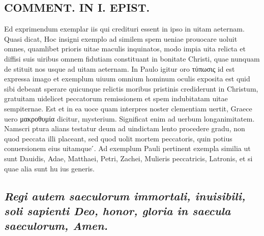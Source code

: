 \documentclass{article}
\begin{document}
\begin{pages}
\section*{COMMENT. IN I. EPIST. }\pstart Ed exprimendum exemplar iis qui credituri essent in ipso in uitam aeternam. Quasi dicat, Hoc insigni exemplo ad similem spem ueniae prouocare uoluit omnes, quamlibet prioris uitae maculis inquinatos, modo impia uita relicta et diffisi suis uiribus omnem fidutiam constituant in bonitate Christi, quae nunquam de stituit nos usque ad uitam aeternam. In Paulo igitur oro τύπωσις id est expressa imago et exemplum uiuum omnium hominum oculis exposita est quid sibi debeant sperare quicunque relictis moribus pristinis crediderunt in Christum, gratuitam uidelicet peccatorum remissionem et spem indubitatam uitae sempiternae. Est et in ea uoce quam interpres noster clementiam uertit, Graece uero μακροθυμία dicitur, mysterium. Significat enim ad uerbum longanimitatem. Namscri ptura alians testatur deum ad uindictam lento procedere gradu, non quod peccata illi placeant, sed quod uolit mortem peccatoris, quin potius conuersionem eius uitamque ́. Ad exemplum Pauli pertinent exempla similia ut sunt Dauidis, Adae, Matthaei, Petri, Zachei, Mulieris peccatricis, Latronis, et si quae alia sunt hu ius generis.  \pend
{}
{}
\subsection*{\textit{Regi autem saeculorum immortali, inuisibili, soli sapienti Deo, honor, gloria in saecula saeculorum, Amen. }}

\end{pages}
\end{document}
